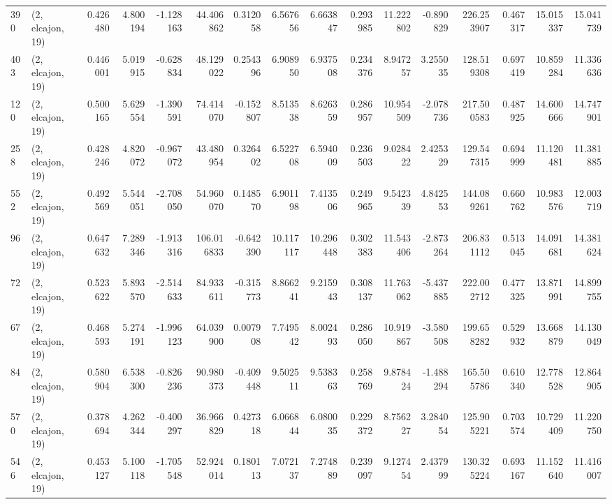 \begin{tabular}{llrrrrrrrrrrrrrr}
390 &  (2, elcajon, 19) &   0.426480 &   4.800194 &  -1.128163 &    44.406862 &   0.312058 &   6.567656 &   6.663847 &  0.293985 &  11.222802 &  -0.890829 &   226.253907 &  0.467317 &  15.015337 &  15.041739 \\
403 &  (2, elcajon, 19) &   0.446001 &   5.019915 &  -0.628834 &    48.129022 &   0.254396 &   6.908950 &   6.937508 &  0.234376 &   8.947257 &   3.255035 &   128.519308 &  0.697419 &  10.859284 &  11.336636 \\
120 &  (2, elcajon, 19) &   0.500165 &   5.629554 &  -1.390591 &    74.414070 &  -0.152807 &   8.513538 &   8.626359 &  0.286957 &  10.954509 &  -2.078736 &   217.500583 &  0.487925 &  14.600666 &  14.747901 \\
258 &  (2, elcajon, 19) &   0.428246 &   4.820072 &  -0.967072 &    43.480954 &   0.326402 &   6.522708 &   6.594009 &  0.236503 &   9.028422 &   2.425329 &   129.547315 &  0.694999 &  11.120481 &  11.381885 \\
552 &  (2, elcajon, 19) &   0.492569 &   5.544051 &  -2.708050 &    54.960070 &   0.148570 &   6.901198 &   7.413506 &  0.249965 &   9.542339 &   4.842553 &   144.089261 &  0.660762 &  10.983576 &  12.003719 \\
96  &  (2, elcajon, 19) &   0.647632 &   7.289346 &  -1.913316 &   106.016833 &  -0.642390 &  10.117117 &  10.296448 &  0.302383 &  11.543406 &  -2.873264 &   206.831112 &  0.513045 &  14.091681 &  14.381624 \\
72  &  (2, elcajon, 19) &   0.523622 &   5.893570 &  -2.514633 &    84.933611 &  -0.315773 &   8.866241 &   9.215943 &  0.308137 &  11.763062 &  -5.437885 &   222.002712 &  0.477325 &  13.871991 &  14.899755 \\
67  &  (2, elcajon, 19) &   0.468593 &   5.274191 &  -1.996123 &    64.039900 &   0.007908 &   7.749542 &   8.002493 &  0.286050 &  10.919867 &  -3.580508 &   199.658282 &  0.529932 &  13.668879 &  14.130049 \\
84  &  (2, elcajon, 19) &   0.580904 &   6.538300 &  -0.826236 &    90.980373 &  -0.409448 &   9.502511 &   9.538363 &  0.258769 &   9.878424 &  -1.488294 &   165.505786 &  0.610340 &  12.778528 &  12.864905 \\
570 &  (2, elcajon, 19) &   0.378694 &   4.262344 &  -0.400297 &    36.966829 &   0.427318 &   6.066844 &   6.080035 &  0.229372 &   8.756227 &   3.284054 &   125.905221 &  0.703574 &  10.729409 &  11.220750 \\
546 &  (2, elcajon, 19) &   0.453127 &   5.100118 &  -1.705548 &    52.924014 &   0.180113 &   7.072137 &   7.274889 &  0.239097 &   9.127454 &   2.437999 &   130.325224 &  0.693167 &  11.152640 &  11.416007 \\

\end{tabular}
